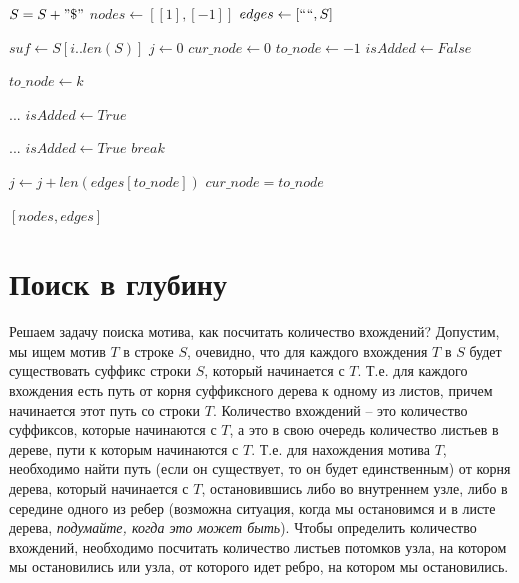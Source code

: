 \documentclass[letterpaper, 11pt]{article}
\begin{document}
\clearpage
\begin{algorithmic}[1]
\State $S = S + " \$ "$
\State $nodes \gets [[1], [-1]]$
\State $edges \gets [`` ``, S]$

\item[]
\State $suf \gets S[i..len(S)]$
\State $j \gets 0$
\State $cur\_node \gets 0$
\State $to\_node \gets -1$
\State $isAdded \gets False$

\item[]
\State $to\_node \gets k$
\EndIf
\EndFor

\item[]

\State $...$ 
\State $isAdded \gets True$
\Else
{}

\State $...$ 
\State $isAdded \gets True$
\State $break$
\EndIf

\EndFor

\State $j \gets j + len(edges[to\_node])$
\State $cur\_node = to\_node$

\EndIf

\EndWhile

\EndFor
\item[]
\State \Return $[nodes, edges]$
\EndProcedure
\end{algorithmic}


\clearpage
\section{Поиск в глубину}
\par
Решаем задачу поиска мотива, как посчитать количество вхождений? Допустим, мы ищем мотив $T$ в строке $S$, очевидно, что для каждого вхождения $T$ в $S$ будет существовать суффикс строки $S$, который начинается с $T$. Т.е. для каждого вхождения есть путь от корня суффиксного дерева к одному из листов, причем начинается этот путь со строки $T$. Количество вхождений -- это количество суффиксов, которые начинаются с $T$, а это в свою очередь количество листьев в дереве, пути к которым начинаются с $T$. Т.е. для нахождения мотива $T$, необходимо найти путь (если он существует, то он будет единственным) от корня дерева, который начинается с $T$, остановившись либо во внутреннем узле, либо в середине одного из ребер (возможна ситуация, когда мы остановимся и в листе дерева, \textit{подумайте, когда это может быть}). Чтобы определить количество вхождений, необходимо посчитать количество листьев потомков узла, на котором мы остановились или узла, от которого идет ребро, на котором мы остановились.
\end{document}
